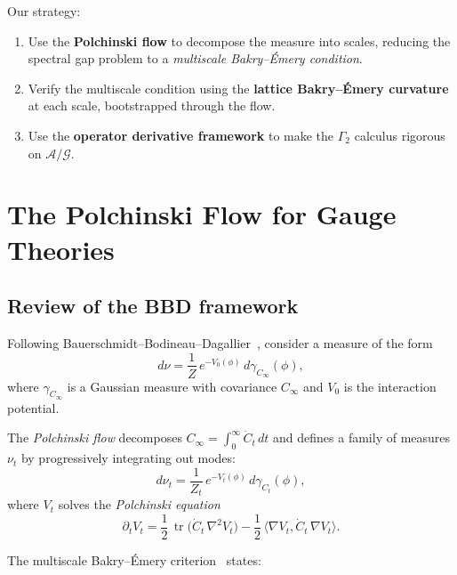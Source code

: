\documentclass[11pt,a4paper]{article}
\theoremstyle{plain}
\theoremstyle{definition}
\theoremstyle{remark}
\newcommand{\cA}{\mathcal{A}}
\newcommand{\cG}{\mathcal{G}}
\newcommand{\tr}{\operatorname{tr}}
\begin{document}
Our strategy:
\begin{enumerate}[nosep]
\item Use the \textbf{Polchinski flow} to decompose the measure
  into scales, reducing the spectral gap problem to a
  \emph{multiscale Bakry--\'Emery condition}.
\item Verify the multiscale condition using the \textbf{lattice
  Bakry--\'Emery curvature} at each scale, bootstrapped through
  the flow.
\item Use the \textbf{operator derivative framework} to make
  the $\Gamma_2$ calculus rigorous on $\cA/\cG$.
\end{enumerate}

\section{The Polchinski Flow for Gauge Theories}

\subsection{Review of the BBD framework}

Following Bauerschmidt--Bodineau--Dagallier~\cite{BBD2024}, consider
a measure of the form
\begin{equation}\label{eq:gibbs}
  d\nu = \frac{1}{Z}\,e^{-V_0(\phi)}\,d\gamma_{C_\infty}(\phi),
\end{equation}
where $\gamma_{C_\infty}$ is a Gaussian measure with covariance
$C_\infty$ and $V_0$ is the interaction potential.

The \emph{Polchinski flow} decomposes $C_\infty = \int_0^\infty
\dot{C}_t\,dt$ and defines a family of measures $\nu_t$ by
progressively integrating out modes:
\begin{equation}\label{eq:polchinski-meas}
  d\nu_t = \frac{1}{Z_t}\,e^{-V_t(\phi)}\,d\gamma_{C_t}(\phi),
\end{equation}
where $V_t$ solves the \emph{Polchinski equation}
\begin{equation}\label{eq:polchinski}
  \partial_t V_t = \frac{1}{2}\,\tr\bigl(\dot{C}_t\,\nabla^2 V_t\bigr)
  - \frac{1}{2}\,\langle \nabla V_t, \dot{C}_t\,\nabla V_t \rangle.
\end{equation}

The multiscale Bakry--\'Emery criterion~\cite{BBD2021} states:
\end{document}
